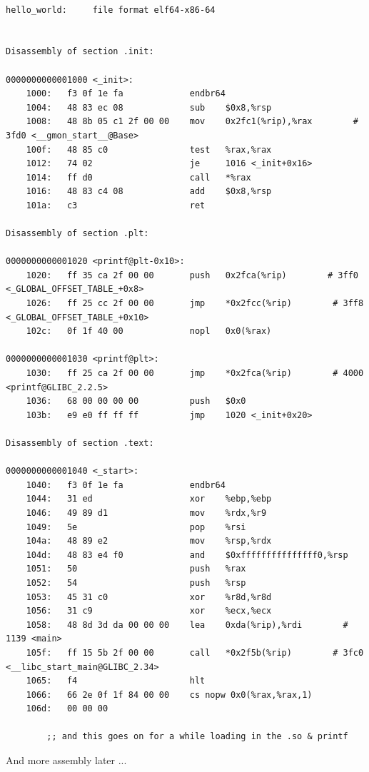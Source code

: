 \documentclass[../notes.tex]{subfiles}
\begin{document}
\begin{listing}[H]
\begin{verbatim}

hello_world:     file format elf64-x86-64


Disassembly of section .init:

0000000000001000 <_init>:
    1000:	f3 0f 1e fa          	endbr64
    1004:	48 83 ec 08          	sub    $0x8,%rsp
    1008:	48 8b 05 c1 2f 00 00 	mov    0x2fc1(%rip),%rax        # 3fd0 <__gmon_start__@Base>
    100f:	48 85 c0             	test   %rax,%rax
    1012:	74 02                	je     1016 <_init+0x16>
    1014:	ff d0                	call   *%rax
    1016:	48 83 c4 08          	add    $0x8,%rsp
    101a:	c3                   	ret

Disassembly of section .plt:

0000000000001020 <printf@plt-0x10>:
    1020:	ff 35 ca 2f 00 00    	push   0x2fca(%rip)        # 3ff0 <_GLOBAL_OFFSET_TABLE_+0x8>
    1026:	ff 25 cc 2f 00 00    	jmp    *0x2fcc(%rip)        # 3ff8 <_GLOBAL_OFFSET_TABLE_+0x10>
    102c:	0f 1f 40 00          	nopl   0x0(%rax)

0000000000001030 <printf@plt>:
    1030:	ff 25 ca 2f 00 00    	jmp    *0x2fca(%rip)        # 4000 <printf@GLIBC_2.2.5>
    1036:	68 00 00 00 00       	push   $0x0
    103b:	e9 e0 ff ff ff       	jmp    1020 <_init+0x20>

Disassembly of section .text:

0000000000001040 <_start>:
    1040:	f3 0f 1e fa          	endbr64
    1044:	31 ed                	xor    %ebp,%ebp
    1046:	49 89 d1             	mov    %rdx,%r9
    1049:	5e                   	pop    %rsi
    104a:	48 89 e2             	mov    %rsp,%rdx
    104d:	48 83 e4 f0          	and    $0xfffffffffffffff0,%rsp
    1051:	50                   	push   %rax
    1052:	54                   	push   %rsp
    1053:	45 31 c0             	xor    %r8d,%r8d
    1056:	31 c9                	xor    %ecx,%ecx
    1058:	48 8d 3d da 00 00 00 	lea    0xda(%rip),%rdi        # 1139 <main>
    105f:	ff 15 5b 2f 00 00    	call   *0x2f5b(%rip)        # 3fc0 <__libc_start_main@GLIBC_2.34>
    1065:	f4                   	hlt
    1066:	66 2e 0f 1f 84 00 00 	cs nopw 0x0(%rax,%rax,1)
    106d:	00 00 00 

		;; and this goes on for a while loading in the .so & printf
\end{verbatim}
\end{listing}


And more assembly later ... 
\end{document}
